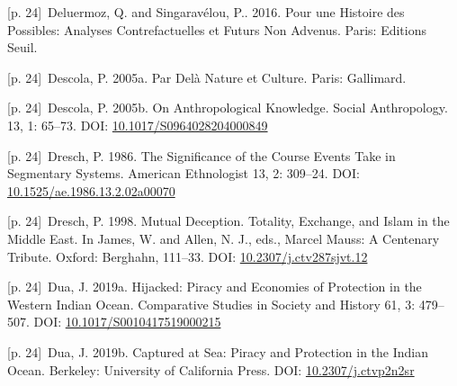 \documentclass[10pt,a4paper]{article}
\begin{document}
\noindent\begin{minipage}[t]{\linewidth}{\scriptsize\color{gray} [p. 24]}\ Deluermoz, Q. and Singaravélou, P.. 2016. Pour une Histoire des Possibles: Analyses Contrefactuelles et Futurs Non Advenus. Paris: Editions Seuil.\par\end{minipage}\par
\noindent\begin{minipage}[t]{\linewidth}{\scriptsize\color{gray} [p. 24]}\ Descola, P. 2005a. Par Delà Nature et Culture. Paris: Gallimard.\par\end{minipage}\par
\noindent\begin{minipage}[t]{\linewidth}{\scriptsize\color{gray} [p. 24]}\ Descola, P. 2005b. On Anthropological Knowledge. Social Anthropology. 13, 1: 65–73. DOI: \url{10.1017/S0964028204000849}\par\end{minipage}\par
\noindent\begin{minipage}[t]{\linewidth}{\scriptsize\color{gray} [p. 24]}\ Dresch, P. 1986. The Significance of the Course Events Take in Segmentary Systems. American Ethnologist 13, 2: 309–24. DOI: \url{10.1525/ae.1986.13.2.02a00070}\par\end{minipage}\par
\noindent\begin{minipage}[t]{\linewidth}{\scriptsize\color{gray} [p. 24]}\ Dresch, P. 1998. Mutual Deception. Totality, Exchange, and Islam in the Middle East. In James, W. and Allen, N. J., eds., Marcel Mauss: A Centenary Tribute. Oxford: Berghahn, 111–33. DOI: \url{10.2307/j.ctv287sjvt.12}\par\end{minipage}\par
\noindent\begin{minipage}[t]{\linewidth}{\scriptsize\color{gray} [p. 24]}\ Dua, J. 2019a. Hijacked: Piracy and Economies of Protection in the Western Indian Ocean. Comparative Studies in Society and History 61, 3: 479–507. DOI: \url{10.1017/S0010417519000215}\par\end{minipage}\par
\noindent\begin{minipage}[t]{\linewidth}{\scriptsize\color{gray} [p. 24]}\ Dua, J. 2019b. Captured at Sea: Piracy and Protection in the Indian Ocean. Berkeley: University of California Press. DOI: \url{10.2307/j.ctvp2n2sr}\par\end{minipage}\par
\end{document}
